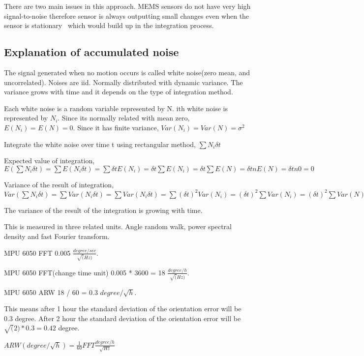 \documentclass{article}
\begin{document}
There are two main issues in this approach. MEMS sensors do not have very high signal-to-noise therefore sensor is always outputting small changes even when the sensor is stationary~\cite{hanly_2016} which would build up in the integration process.

\subsection{Explanation of accumulated noise}

The signal generated when no motion occurs is called white noise(zero mean, and uncorrelated). Noises are iid. Normally distributed with dynamic variance. The variance grows with time and it depends on the type of integration method. 

Each white noise is a random variable represented by N. ith white noise is represented by $N_i$. Since its normally related with mean zero, $E(N_i) = E(N) = 0$. Since it has finite variance, $Var(N_i) = Var(N) = \sigma^2$

Integrate the white noise over time t using rectangular method, $ \sum{N_i \delta t}$

Expected value of integration, $E(\sum{N_i \delta t}) = \sum{E(N_i \delta t)} = \sum{\delta t E(N_i)} = \delta t \sum{E(N_i)} = \delta t \sum{E(N)} = \delta t n E(N) = \delta t n 0 = 0$

Variance of the result of integration, $Var(\sum{N_i \delta t}) =  \sum{Var(N_i \delta t)} = \sum{Var(N_i \delta t)} = \sum{(\delta t)^2 Var(N_i)} = (\delta t)^2\sum{Var(N_i)} = (\delta t)^2\sum{Var(N)} = (\delta t)^2 n Var(N) =  (\delta t)^2 n \sigma^2 $

The variance of the result of the integration is growing with time.

This is measured in three related units. Angle random walk, power spectral density and fast Fourier transform.

MPU 6050 FFT 0.005 $\frac{degree / sec}{\sqrt(Hz)}$.

MPU 6050 FFT(change time unit) 0.005 * 3600 = 18 $\frac{degree / h}{\sqrt(Hz)}$.

MPU 6050 ARW 18 / 60  = 0.3 $degree / \sqrt h$.

This means after 1 hour the standard deviation of the orientation error will be 0.3 degree.
After 2 hour the standard deviation of the orientation error will be $\sqrt(2) * 0.3 = 0.42 $ degree.


$ARW (degree / \sqrt h) = \frac{1}{60} FFT \frac{degree / h}{\sqrt{Hz}}$
\end{document}
